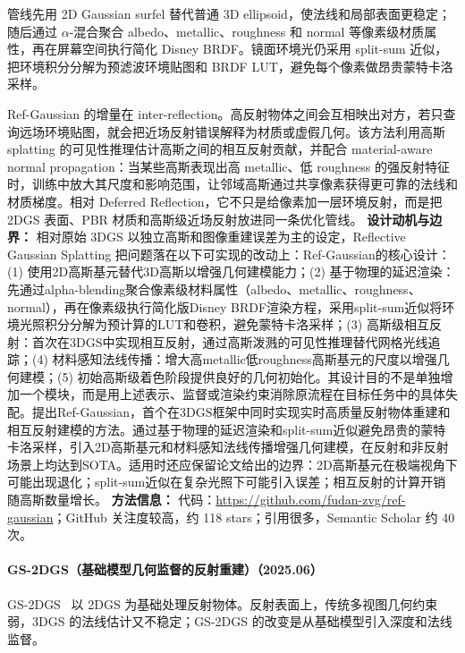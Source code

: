 管线先用 2D Gaussian surfel 替代普通 3D ellipsoid，使法线和局部表面更稳定；随后通过 $\alpha$-混合聚合 albedo、metallic、roughness 和 normal 等像素级材质属性，再在屏幕空间执行简化 Disney BRDF。镜面环境光仍采用 split-sum 近似，把环境积分分解为预滤波环境贴图和 BRDF LUT，避免每个像素做昂贵蒙特卡洛采样。

Ref-Gaussian 的增量在 inter-reflection。高反射物体之间会互相映出对方，若只查询远场环境贴图，就会把近场反射错误解释为材质或虚假几何。该方法利用高斯 splatting 的可见性推理估计高斯之间的相互反射贡献，并配合 material-aware normal propagation：当某些高斯表现出高 metallic、低 roughness 的强反射特征时，训练中放大其尺度和影响范围，让邻域高斯通过共享像素获得更可靠的法线和材质梯度。相对 Deferred Reflection，它不只是给像素加一层环境反射，而是把 2DGS 表面、PBR 材质和高斯级近场反射放进同一条优化管线。
\textbf{设计动机与边界：} 相对原始 3DGS 以独立高斯和图像重建误差为主的设定，Reflective Gaussian Splatting 把问题落在以下可实现的改动上：Ref-Gaussian的核心设计：(1) 使用2D高斯基元替代3D高斯以增强几何建模能力；(2) 基于物理的延迟渲染：先通过alpha-blending聚合像素级材料属性（albedo、metallic、roughness、normal），再在像素级执行简化版Disney BRDF渲染方程，采用split-sum近似将环境光照积分分解为预计算的LUT和卷积，避免蒙特卡洛采样；(3) 高斯级相互反射：首次在3DGS中实现相互反射，通过高斯泼溅的可见性推理替代网格光线追踪；(4) 材料感知法线传播：增大高metallic低roughness高斯基元的尺度以增强几何建模；(5) 初始高斯级着色阶段提供良好的几何初始化。其设计目的不是单独增加一个模块，而是用上述表示、监督或渲染约束消除原流程在目标任务中的具体失配。提出Ref-Gaussian，首个在3DGS框架中同时实现实时高质量反射物体重建和相互反射建模的方法。通过基于物理的延迟渲染和split-sum近似避免昂贵的蒙特卡洛采样，引入2D高斯基元和材料感知法线传播增强几何建模，在反射和非反射场景上均达到SOTA。适用时还应保留论文给出的边界：2D高斯基元在极端视角下可能出现退化；split-sum近似在复杂光照下可能引入误差；相互反射的计算开销随高斯数量增长。
\textbf{方法信息：} 代码：\url{https://github.com/fudan-zvg/ref-gaussian}；GitHub 关注度较高，约 118 stars；引用很多，Semantic Scholar 约 40 次。



\paragraph{GS-2DGS（基础模型几何监督的反射重建）（2025.06）}
GS-2DGS~\cite{2506_13110} 以 2DGS 为基础处理反射物体。反射表面上，传统多视图几何约束弱，3DGS 的法线估计又不稳定；GS-2DGS 的改变是从基础模型引入深度和法线监督。

